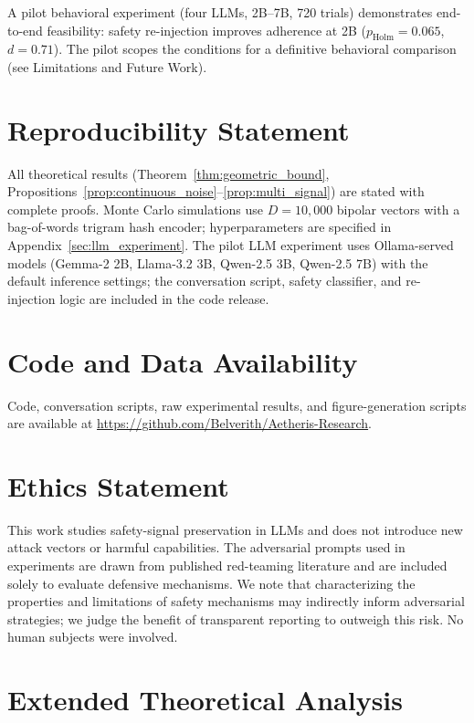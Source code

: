 \documentclass[a4paper,11pt]{article}
\begin{document}
A pilot behavioral experiment (four LLMs, 2B--7B, 720 trials) demonstrates end-to-end feasibility: safety re-injection improves adherence at 2B ($p_{\text{Holm}} = 0.065$, $d = 0.71$). The pilot scopes the conditions for a definitive behavioral comparison (see Limitations and Future Work).

\section*{Reproducibility Statement}
All theoretical results (Theorem~\ref{thm:geometric_bound}, Propositions~\ref{prop:continuous_noise}--\ref{prop:multi_signal}) are stated with complete proofs. Monte Carlo simulations use $D = 10{,}000$ bipolar vectors with a bag-of-words trigram hash encoder; hyperparameters are specified in Appendix~\ref{sec:llm_experiment}. The pilot LLM experiment uses Ollama-served models (Gemma-2 2B, Llama-3.2 3B, Qwen-2.5 3B, Qwen-2.5 7B) with the default inference settings; the conversation script, safety classifier, and re-injection logic are included in the code release.

\section*{Code and Data Availability}
Code, conversation scripts, raw experimental results, and figure-generation scripts are available at \url{https://github.com/Belverith/Aetheris-Research}.

\section*{Ethics Statement}
This work studies safety-signal preservation in LLMs and does not introduce new attack vectors or harmful capabilities. The adversarial prompts used in experiments are drawn from published red-teaming literature \cite{perez2022, wei2023} and are included solely to evaluate defensive mechanisms. We note that characterizing the properties and limitations of safety mechanisms may indirectly inform adversarial strategies; we judge the benefit of transparent reporting to outweigh this risk. No human subjects were involved.



\appendix

\section{Extended Theoretical Analysis}
\label{app:extensions}
\end{document}
